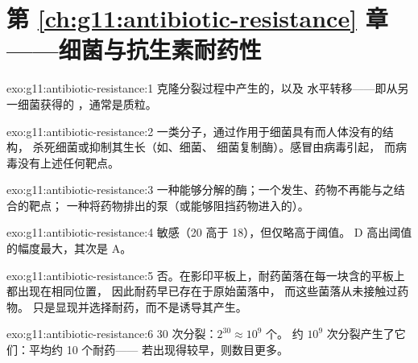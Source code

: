 \section*{第 \ref{ch:g11:antibiotic-resistance} 章——细菌与抗生素耐药性}

\begin{solution}{exo:g11:antibiotic-resistance:1}
克隆分裂过程中产生的，以及
水平转移——即从另一细菌获得的 ，通常是质粒。
\end{solution}

\begin{solution}{exo:g11:antibiotic-resistance:2}
一类分子，通过作用于细菌具有而人体没有的结构，
杀死细菌或抑制其生长（如、细菌、
细菌复制酶）。感冒由病毒引起，
而病毒没有上述任何靶点。
\end{solution}

\begin{solution}{exo:g11:antibiotic-resistance:3}
一种能够分解的酶；一个发生、药物不再能与之结合的靶点；
一种将药物排出的泵（或能够阻挡药物进入的）。
\end{solution}

\begin{solution}{exo:g11:antibiotic-resistance:4}
敏感（20 高于 18），但仅略高于阈值。
D 高出阈值的幅度最大，其次是 A。
\end{solution}

\begin{solution}{exo:g11:antibiotic-resistance:5}
否。在影印平板上，耐药菌落在每一块含的平板上都出现在相同位置，
因此耐药早已存在于原始菌落中，
而这些菌落从未接触过药物。
只是显现并选择耐药，而不是诱导其产生。
\end{solution}

\begin{solution}{exo:g11:antibiotic-resistance:6}
30 次分裂：$2^{30} \approx 10^9$ 个。
约 $10^9$ 次分裂产生了它们：平均约 10 个耐药——
若出现得较早，则数目更多。
\end{solution}


